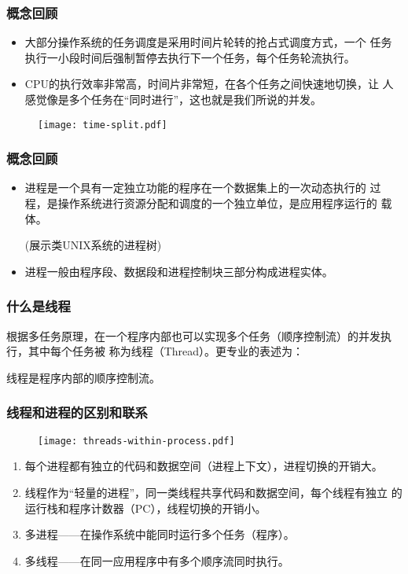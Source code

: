 \begin{frame}[fragile]
  \frametitle{概念回顾}

  
  \begin{itemize}
  \item 大部分操作系统的任务调度是采用时间片轮转的抢占式调度方式，一个
    任务执行一小段时间后强制暂停去执行下一个任务，每个任务轮流执行。
  \item CPU的执行效率非常高，时间片非常短，在各个任务之间快速地切换，让
    人感觉像是多个任务在“同时进行”，这也就是我们所说的{\hei\Red 并发}。
  \end{itemize}

  \begin{figure}
    \centering
    \texttt{[image: time-split.pdf]}
  \end{figure}
\end{frame}

\begin{frame}[fragile]
  \frametitle{概念回顾}

  
  \begin{itemize}
  \item 进程是一个具有一定独立功能的程序在一个数据集上的一次动态执行的
    过程，是操作系统进行资源分配和调度的一个独立单位，是应用程序运行的
    载体。

    {\kai\Red (展示类UNIX系统的进程树)}
    
  \item 进程一般由{\hei\Blue 程序段、数据段和进程控制块}三部分构成进程实体。
  \end{itemize}
\end{frame}


\begin{frame}[fragile] %
  \frametitle{什么是线程}

  根据多任务原理，在一个程序内部也可以实现多个任务（顺序控制流）的并发执行，其中每个任务被
  称为线程（Thread）。更专业的表述为：

  {\Blue\hei 线程是程序内部的顺序控制流。}
\end{frame}

\begin{frame}[fragile] %
  \frametitle{线程和进程的区别和联系}

  \begin{figure}
    \centering
    \texttt{[image: threads-within-process.pdf]}
  \end{figure}
  \pause
  \begin{enumerate}\small\kai
  \item 每个进程都有独立的代码和数据空间（进程上下文），进程切换的开销大。
  \item 线程作为“轻量的进程”，同一类线程共享代码和数据空间，每个线程有独立
    的运行栈和程序计数器（PC），线程切换的开销小。
  \item 多进程——在操作系统中能同时运行多个任务（程序）。
  \item 多线程——在同一应用程序中有多个顺序流同时执行。
  \end{enumerate}
\end{frame}

